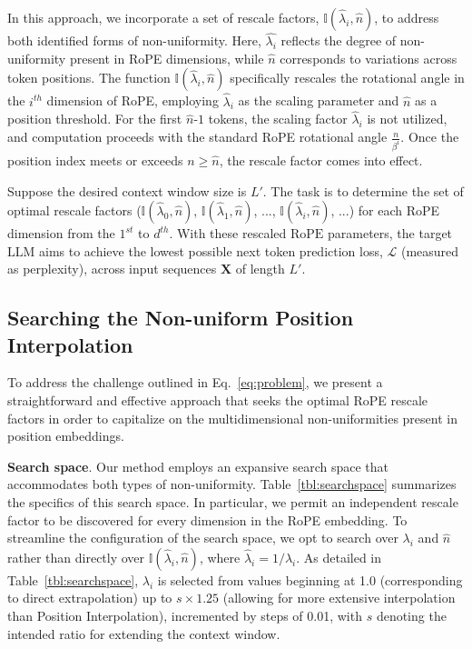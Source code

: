 In this approach, we incorporate a set of rescale factors, $\mathbb{I}(\hat{\lambda}_{i},\hat{n})$, to address both identified forms of non-uniformity. Here, $\hat{\lambda_i}$ reflects the degree of non-uniformity present in RoPE dimensions, while $\hat{n}$ corresponds to variations across token positions. The function $\mathbb{I}(\hat{\lambda}_{i},\hat{n})$ specifically rescales the rotational angle in the $i^{th}$ dimension of RoPE, employing $\hat\lambda_{i}$ as the scaling parameter and $\hat{n}$ as a position threshold. For the first $\hat{n}$-$1$ tokens, the scaling factor $\hat\lambda_{i}$ is not utilized, and computation proceeds with the standard RoPE rotational angle $\frac{n}{\beta^i}$. Once the position index meets or exceeds $n \ge \hat{n}$, the rescale factor comes into effect.

Suppose the desired context window size is $L'$. The task is to determine the set of optimal rescale factors ($\mathbb{I}(\hat{\lambda}_{0},\hat{n})$, $\mathbb{I}(\hat{\lambda}_{1},\hat{n})$, ..., $\mathbb{I}(\hat{\lambda}_{i},\hat{n})$, ...) for each RoPE dimension from the $1^{st}$ to $d^{th}$. With these rescaled $\text{RoPE}$ parameters, the target $\text{LLM}$ aims to achieve the lowest possible next token prediction loss, $\mathcal{L}$ (measured as perplexity), across input sequences $\mathbf{X}$ of length $L'$.

\subsection{Searching the Non-uniform Position Interpolation}

To address the challenge outlined in Eq.~\ref{eq:problem}, we present a straightforward and effective approach that seeks the optimal RoPE rescale factors in order to capitalize on the multidimensional non-uniformities present in position embeddings.

\textbf{Search space}. Our method employs an expansive search space that accommodates both types of non-uniformity. Table~\ref{tbl:searchspace} summarizes the specifics of this search space. In particular, we permit an independent rescale factor to be discovered for every dimension in the RoPE embedding. To streamline the configuration of the search space, we opt to search over $\lambda_i$ and $\hat{n}$ rather than directly over $\mathbb{I}(\hat{\lambda}_{i},\hat{n})$, where $\hat{\lambda}_{i}=1/\lambda_i$. As detailed in Table~\ref{tbl:searchspace}, $\lambda_i$ is selected from values beginning at 1.0 (corresponding to direct extrapolation) up to $s\times1.25$ (allowing for more extensive interpolation than Position Interpolation), incremented by steps of 0.01, with $s$ denoting the intended ratio for extending the context window.

